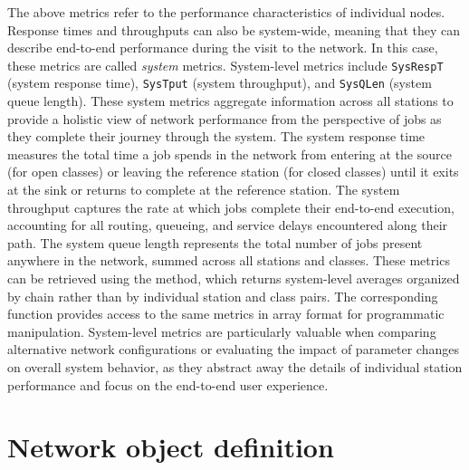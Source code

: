 The above metrics refer to the performance characteristics of individual nodes. Response times and throughputs can also be system-wide, meaning that they can describe end-to-end performance during the visit to the network. In this case, these metrics are called {\em system} metrics. System-level metrics include \texttt{SysRespT} (system response time), \texttt{SysTput} (system throughput), and \texttt{SysQLen} (system queue length). These system metrics aggregate information across all stations to provide a holistic view of network performance from the perspective of jobs as they complete their journey through the system. The system response time measures the total time a job spends in the network from entering at the source (for open classes) or leaving the reference station (for closed classes) until it exits at the sink or returns to complete at the reference station. The system throughput captures the rate at which jobs complete their end-to-end execution, accounting for all routing, queueing, and service delays encountered along their path. The system queue length represents the total number of jobs present anywhere in the network, summed across all stations and classes. These metrics can be retrieved using the  method, which returns system-level averages organized by chain rather than by individual station and class pairs. The corresponding  function provides access to the same metrics in array format for programmatic manipulation. System-level metrics are particularly valuable when comparing alternative network configurations or evaluating the impact of parameter changes on overall system behavior, as they abstract away the details of individual station performance and focus on the end-to-end user experience.

\section{Network object definition}
\label{network-object-definition}
